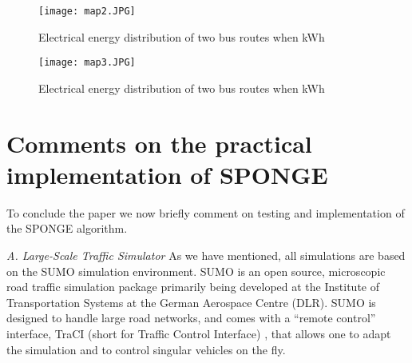 \documentclass[journal]{IEEEtran}
\begin{document}
\begin{figure}[htbp]
	\begin{center}
		\vspace{0.5cm}
		{\texttt{[image: map2.JPG]}}
		\caption{Electrical energy distribution of two bus routes when kWh}
		\label{Eav100}
	\end{center}
\end{figure}



\begin{figure}[htbp]
	\begin{center}
		\vspace{0.25cm}
		{\texttt{[image: map3.JPG]}}
		\caption{Electrical energy distribution of two bus routes when kWh}
		\label{Eav50}
	\end{center}
\end{figure}



\section{Comments on the practical implementation of SPONGE}

To conclude the paper we now briefly comment on testing and implementation of the SPONGE algorithm.\newline

{\em A. Large-Scale Traffic Simulator} As we have mentioned, all simulations are based on the SUMO simulation environment. SUMO \cite{SUMORef} is an open source, microscopic road traffic simulation package primarily being developed at the Institute of Transportation Systems at the German Aerospace Centre (DLR). SUMO is designed to handle large road networks, and comes with a ``remote control'' interface, TraCI (short for Traffic Control Interface) \cite{b4}, that allows one to adapt the simulation and to control singular vehicles on the fly.\newline 
\end{document}
